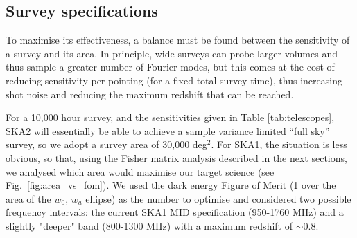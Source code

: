 \documentclass[useAMS,usenatbib]{mn2e}
\newcommand{\corr}{\color{blue}} %
\begin{document}
\subsection{Survey specifications}
\label{survey}

To maximise its effectiveness, a balance must be found between the sensitivity of a survey and its area. In principle, wide surveys can probe larger volumes and thus sample a greater number of Fourier modes, but this comes at the cost of reducing sensitivity per pointing (for a fixed total survey time), thus increasing shot noise and reducing the maximum redshift that can be reached. {\corr For a 10,000 hour survey, and the sensitivities given in Table \ref{tab:telescopes}, SKA2 will essentially be able to achieve a sample variance limited ``full sky'' survey, so we adopt a survey area of 30,000 deg$^2$. For SKA1, the situation is less obvious, so that, using the Fisher matrix analysis described in the next sections, we analysed which area would maximise our target science (see Fig.~\ref{fig:area_vs_fom}). We used the dark energy Figure of Merit (1 over the area of the $w_0$, $w_a$ ellipse) as the number to optimise and considered two possible frequency intervals: the current SKA1 MID specification (950-1760 MHz) and a slightly "deeper" band (800-1300 MHz) with a maximum redshift of $\sim 0.8$.

}
\end{document}

